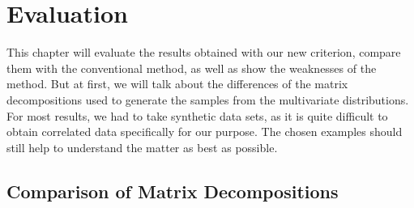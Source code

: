 \chapter{Evaluation}\label{chap:Eval}

This chapter will evaluate the results obtained with our new criterion,
compare them with the conventional method, as well as show the
weaknesses of the method. But at first, we will talk about the
differences of the matrix decompositions used to generate the samples
from the multivariate distributions. For most results, we had to take
synthetic data sets, as it is quite difficult to obtain correlated
data specifically for our purpose. The chosen examples should still
help to understand the matter as best as possible.

\section{Comparison of Matrix Decompositions}\label{sec:evalMD}

